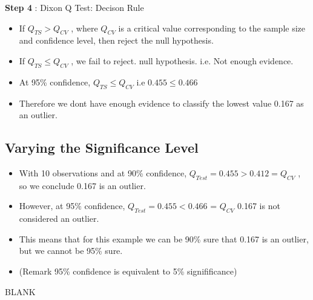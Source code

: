 \documentclass[a4paper,12pt]{article}
\begin{document}
\medskip
\textbf{Step 4} : Dixon Q Test: Decison Rule
\begin{itemize}
	\item 	If $Q_{TS} > Q_{CV}$ , where $Q_{CV}$ is a critical value corresponding to the sample size and confidence level, then reject the null hypothesis. 
	\item  If $Q_{TS} \leq Q_{CV}$ , we fail to reject. null hypothesis. i.e. Not enough evidence. \smallskip
	\item At 95\% confidence, $Q_{TS} \leq Q_{CV}$ i.e $ 0.455 \leq 0.466$ 
	\item Therefore we dont have enough evidence to classify the lowest value 0.167 as an outlier. 
	
\end{itemize}	

\newpage




\subsection*{Varying the Significance Level}
\begin{itemize}
	\item	With 10 observations and at 90\% confidence, $Q_{Test} = 0.455 > 0.412 =Q_{CV}$ , so we conclude 0.167 is an outlier.
	\item  However, at 95\% confidence, $Q_{Test} = 0.455 < 0.466$ = $Q_{CV}$ 0.167 is not considered an outlier. 
	
	\item This means that for this example we can be 90\% sure that 0.167 is an outlier, but we cannot be 95\% sure.
	\bigskip
	\item (Remark 95\% confidence is equivalent to 5\% signifificance)
\end{itemize}	



\newpage
BLANK
\end{document}
